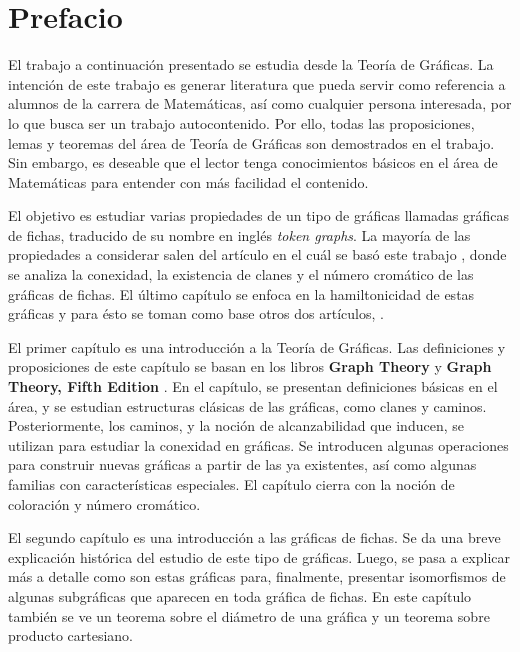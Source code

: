 \chapter{Prefacio}
\label{sec:prefacio}

El trabajo a continuaci\'on presentado se estudia desde la Teor\'ia de
Gr\'aficas. La intenci\'on de este trabajo es generar literatura que pueda
servir como referencia a alumnos de la carrera de Matem\'aticas, as\'i como
cualquier persona interesada, por lo que busca ser un trabajo autocontenido. Por
ello, todas las proposiciones, lemas y teoremas del \'area de Teor\'ia de
Gr\'aficas son demostrados en el trabajo. Sin embargo, es deseable que el lector
tenga conocimientos b\'asicos en el \'area de Matem\'aticas para entender con
m\'as facilidad el contenido. 

El objetivo es estudiar varias propiedades de un tipo de gr\'aficas llamadas
gr\'aficas de fichas, traducido de su nombre en ingl\'es \textit{token graphs}.
La mayor\'ia de las propiedades a considerar salen del art\'iculo en el cu\'al
se bas\'o este trabajo \cite{fabilaToken}, donde se analiza la conexidad, la
existencia de clanes y el n\'umero crom\'atico de las gr\'aficas de fichas. El
\'ultimo cap\'itulo se enfoca en la hamiltonicidad de estas gr\'aficas y para
\'esto se toman como base otros dos art\'iculos, \cite{adameHamilt,
riveraHamilt}. 

El primer cap\'itulo es una introducci\'on a la Teor\'ia de Gr\'aficas. Las
definiciones y proposiciones de este cap\'itulo se basan en los libros
\textbf{Graph Theory} \cite{bondy2008} y \textbf{Graph Theory, Fifth Edition}
\cite{diestel2017}. En el cap\'itulo, se presentan definiciones b\'asicas en el
\'area, y se estudian estructuras cl\'asicas de las gr\'aficas, como clanes y
caminos. Posteriormente, los caminos, y la noci\'on de alcanzabilidad que
inducen, se utilizan para estudiar la conexidad en gr\'aficas.   Se introducen
algunas operaciones para construir nuevas gr\'aficas a partir de las ya
existentes, as\'i como algunas familias con caracter\'isticas especiales.   El
cap\'itulo cierra con la noci\'on de coloraci\'on y n\'umero crom\'atico.

El segundo cap\'itulo es una introducci\'on a las gr\'aficas de fichas. Se da
una breve explicaci\'on hist\'orica del estudio de este tipo de gr\'aficas.
Luego, se pasa a explicar m\'as a detalle como son estas gr\'aficas para,
finalmente, presentar isomorfismos de algunas subgr\'aficas que aparecen en toda
gr\'afica de fichas. En este cap\'itulo tambi\'en se ve un teorema sobre el
di\'ametro de una gr\'afica y un teorema sobre producto cartesiano.

